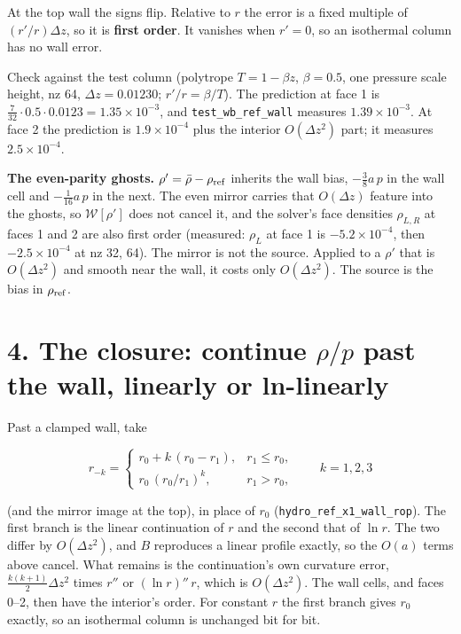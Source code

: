 \documentclass[11pt,a4paper]{article}
\begin{document}
At the top wall the signs flip. Relative to $r$ the error is a fixed multiple of $(r'/r)\Delta z$, so it is
\textbf{first order}. It vanishes when $r' = 0$, so an isothermal column has no wall error.

Check against the test column (polytrope $T = 1 - \beta z$, $\beta = 0.5$, one pressure scale height, nz 64,
$\Delta z = 0.01230$; $r'/r = \beta/T$). The prediction at face 1 is $\tfrac{7}{32}\cdot0.5\cdot0.0123 = 1.35\times10^{-3}$,
and \texttt{test\_wb\_ref\_wall} measures $1.39\times10^{-3}$. At face 2 the prediction is $1.9\times10^{-4}$ plus the
interior $O(\Delta z^2)$ part; it measures $2.5\times10^{-4}$.

\textbf{The even-parity ghosts.} $\rho' = \bar\rho - \rho_{\rm ref}$ inherits the wall bias,
$-\tfrac38 a\,p$ in the wall cell and $-\tfrac1{16}a\,p$ in the next. The even mirror carries that $O(\Delta z)$
feature into the ghosts, so $\mathcal W[\rho']$ does not cancel it, and the solver's face densities $\rho_{L,R}$ at
faces 1 and 2 are also first order (measured: $\rho_L$ at face 1 is $-5.2\times10^{-4}$, then $-2.5\times10^{-4}$ at nz 32, 64).
The mirror is not the source. Applied to a $\rho'$ that is $O(\Delta z^2)$ and smooth near the wall, it costs
only $O(\Delta z^2)$. The source is the bias in $\rho_{\rm ref}$.

\section*{4. The closure: continue $\rho/p$ past the wall, linearly or ln-linearly}

Past a clamped wall, take

\begin{equation*}
r_{-k} = \begin{cases} r_0 + k\,(r_0 - r_1), & r_1 \le r_0,\\ r_0\,(r_0/r_1)^k, & r_1 > r_0,\end{cases}
\qquad k = 1, 2, 3
\end{equation*}

(and the mirror image at the top), in place of $r_0$ (\texttt{hydro\_ref\_x1\_wall\_rop}). The first branch is the linear
continuation of $r$ and the second that of $\ln r$. The two differ by $O(\Delta z^2)$, and $B$ reproduces a linear
profile exactly, so the $O(a)$ terms above cancel. What remains is the continuation's own curvature error,
$\tfrac{k(k+1)}{2}\Delta z^2$ times $r''$ or $(\ln r)''\,r$, which is $O(\Delta z^2)$. The wall cells, and faces
0–2, then have the interior's order. For constant $r$ the first branch gives $r_0$ exactly, so an isothermal
column is unchanged bit for bit.
\end{document}
